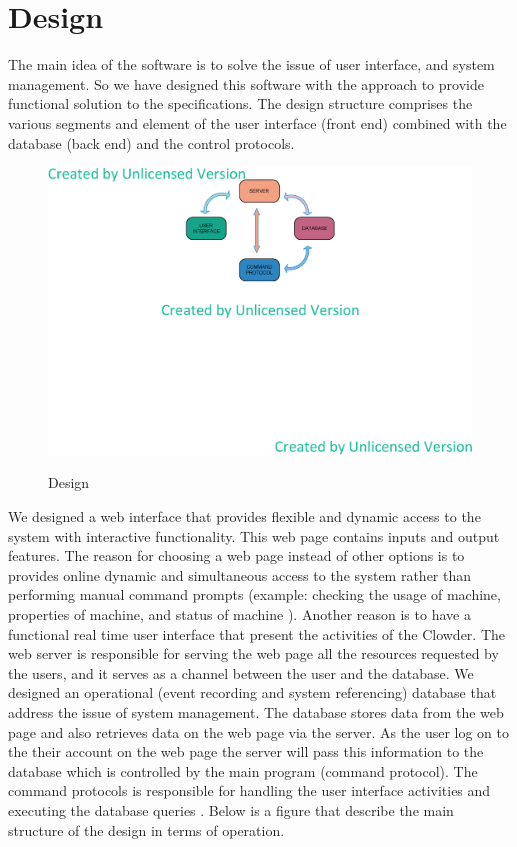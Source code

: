 \section{Design}
The main idea of the software is to solve the issue of user interface, and system management. So we have designed this software with the approach to provide functional solution to the specifications. The design structure comprises the various  segments and element of the user interface (front end) combined with the database (back end)  and the control protocols. 

\begin{figure}[h]
  \includegraphics[width=\linewidth]{design.eps}
  \label{fig:Design of program}
  \caption{Design}
\end{figure}

We designed a web interface that provides  flexible and dynamic access to the system with interactive functionality. This web page contains inputs and output features. The reason for choosing a web page instead of other options is to provides online dynamic and simultaneous  access to the system rather than performing manual command prompts (example: checking the usage of machine, properties of machine, and status of machine ). Another reason is to have a functional real time user interface that present the activities of the Clowder. The web server is responsible for serving the web page all the resources requested by the users, and it serves as a channel between the user and the database. We designed an operational (event recording and system referencing) database that address the issue of system management. The database stores data from the web page and also retrieves data on the web page via the server. As the user log on to the their account on the web page the server will pass this information to the  database which is controlled by the main program (command protocol). The command protocols is responsible for handling the user interface activities and executing the database queries .  Below is a figure that describe the main structure of the design in terms of operation.

